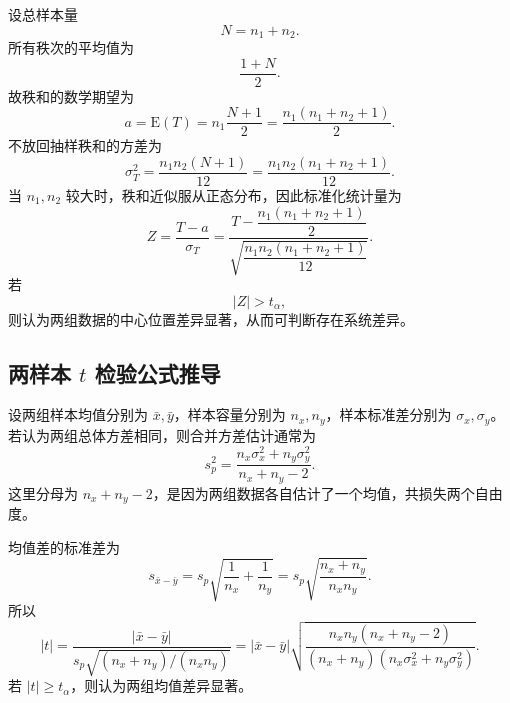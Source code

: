 \documentclass[UTF8,12pt,a4paper]{ctexart}
\newcommand{\E}{\mathrm{E}}
\newcommand{\abs}[1]{\left|#1\right|}
\begin{document}
设总样本量
\begin{equation*}
    N=n_1+n_2 .
\end{equation*}
所有秩次的平均值为
\begin{equation*}
    \frac{1+N}{2} .
\end{equation*}
故秩和的数学期望为
\begin{equation*}
    a=\E(T)=n_1\frac{N+1}{2}
    =\frac{n_1(n_1+n_2+1)}{2} .
\end{equation*}
不放回抽样秩和的方差为
\begin{equation*}
    \sigma_T^2=\frac{n_1n_2(N+1)}{12}
    =\frac{n_1n_2(n_1+n_2+1)}{12} .
\end{equation*}
当 $n_1,n_2$ 较大时，秩和近似服从正态分布，因此标准化统计量为
\begin{equation*}
    Z=\frac{T-a}{\sigma_T}
    =\frac{T-\dfrac{n_1(n_1+n_2+1)}{2}}
    {\sqrt{\dfrac{n_1n_2(n_1+n_2+1)}{12}}} .
\end{equation*}
若
\begin{equation*}
    \abs{Z}>t_\alpha,
\end{equation*}
则认为两组数据的中心位置差异显著，从而可判断存在系统差异。

\newpage

\subsection{两样本 $t$ 检验公式推导}
设两组样本均值分别为 $\bar{x},\bar{y}$，样本容量分别为 $n_x,n_y$，样本标准差分别为 $\sigma_x,\sigma_y$。若认为两组总体方差相同，则合并方差估计通常为
\begin{equation*}
    s_p^2=\frac{n_x\sigma_x^2+n_y\sigma_y^2}{n_x+n_y-2} .
\end{equation*}
这里分母为 $n_x+n_y-2$，是因为两组数据各自估计了一个均值，共损失两个自由度。

均值差的标准差为
\begin{equation*}
    s_{\bar{x}-\bar{y}}=s_p\sqrt{\frac{1}{n_x}+\frac{1}{n_y}}
    =s_p\sqrt{\frac{n_x+n_y}{n_xn_y}} .
\end{equation*}
所以
\begin{equation*}
    \abs{t}
    =\frac{\abs{\bar{x}-\bar{y}}}{s_p\sqrt{(n_x+n_y)/(n_xn_y)}}
    =\abs{\bar{x}-\bar{y}}\sqrt{\frac{n_xn_y(n_x+n_y-2)}{(n_x+n_y)(n_x\sigma_x^2+n_y\sigma_y^2)}} .
\end{equation*}
若 $\abs{t}\ge t_\alpha$，则认为两组均值差异显著。
\end{document}
